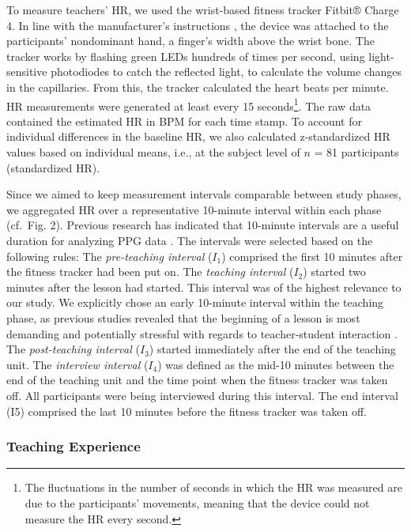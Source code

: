 \documentclass[preprint, 3p,
authoryear]{elsarticle} %
\begin{document}
To measure teachers' HR, we used the wrist-based fitness tracker Fitbit®
Charge 4. In line with the manufacturer's instructions \citep{fitbitnd},
the device was attached to the participants' nondominant hand, a
finger's width above the wrist bone. The tracker works by flashing green
LEDs hundreds of times per second, using light-sensitive photodiodes to
catch the reflected light, to calculate the volume changes in the
capillaries. From this, the tracker calculated the heart beats per
minute. HR measurements were generated at least every 15
seconds\footnote{The fluctuations in the number of seconds in which the
  HR was measured are due to the participants' movements, meaning that
  the device could not measure the HR every second.}. The raw data
contained the estimated HR in BPM for each time stamp. To account for
individual differences in the baseline HR, we also calculated
z-standardized HR values based on individual means, i.e., at the subject
level of \(n\) = 81 participants (standardized HR).

Since we aimed to keep measurement intervals comparable between study
phases, we aggregated HR over a representative 10-minute interval within
each phase (cf.~Fig. 2). Previous research has indicated that 10-minute
intervals are a useful duration for analyzing PPG data
\citep{lu2008can}. The intervals were selected based on the following
rules: The \emph{pre-teaching interval} (\(I_1\)) comprised the first 10
minutes after the fitness tracker had been put on. The \emph{teaching
interval} (\(I_2\)) started two minutes after the lesson had started.
This interval was of the highest relevance to our study. We explicitly
chose an early 10-minute interval within the teaching phase, as previous
studies revealed that the beginning of a lesson is most demanding and
potentially stressful with regards to teacher-student interaction
\citep{donker2018, claessens2017positive}. The \emph{post-teaching
interval} (\(I_3\)) started immediately after the end of the teaching
unit. The \emph{interview interval} (\(I_4\)) was defined as the mid-10
minutes between the end of the teaching unit and the time point when the
fitness tracker was taken off. All participants were being interviewed
during this interval. The end interval (I5) comprised the last 10
minutes before the fitness tracker was taken off.

\subsubsection{Teaching Experience}\label{teaching-experience}
\end{document}
